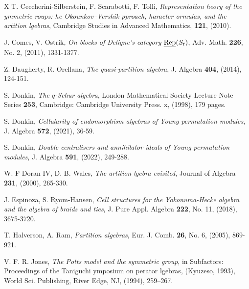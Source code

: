 \documentclass[10pt,hidelinks]{article}
\numberwithin{equation}{section}
\begin{document}
\begin{thebibliography}{X}
T. Ceccherini-Silberstein, F. Scarabotti, F. Tolli,
  \textit{Representation {\it {\color{black}{t}}}heory of the {\it {\color{black}{s}}}ymmetric
    {\it {\color{black}{g}}}roups: {\it {\color{black}{t}}}he Okounkov–Vershik {\it {\color{black}{a}}}pproach, {\it {\color{black}{c}}}haracter {\it {\color{black}{f}}}ormulas, and the
  {\it {\color{black}{p}}}artition {\it {\color{black}{a}}}lgebras},
  Cambridge Studies in Advanced Mathematics, {\bf 121}, (2010).

J. Comes, V. Ostrik, \textit{On blocks of Deligne’s category $ \underline{\rm Rep}(S_t) $}, 
Adv. Math. {\bf 226}, No. 2, (2011), 1331-1377.
  
  



  

Z. Daugherty, R. Orellana,  \textit{The quasi-partition algebra}, 
J. Algebra {\bf 404}, (2014), 124-151.


  

S. Donkin, \textit{The $q$-Schur algebra}, 
London Mathematical Society Lecture Note Series {\bf 253}, Cambridge: Cambridge University Press. x, (1998), 179 pages. 


S. Donkin,
{\it Cellularity of endomorphism algebras of Young permutation modules}, 
J. Algebra {\bf 572}, (2021), 36-59.




S. Donkin,
{\it Double centralisers and annihilator ideals of Young permutation modules}, 
J. Algebra {\bf 591}, (2022), 249-288.



W. F Doran IV, D. B. Wales, \textit{The {\it {\color{black}{p}}}artition
  {\it {\color{black}{a}}}lgebra {\it {\color{black}{r}}}evisited},
  Journal of Algebra {\bf 231}, (2000), 265-330.
  

J. Espinoza, S. Ryom-Hansen,
{\it Cell structures for the Yokonuma-Hecke algebra and the algebra of braids and ties}, 
J. Pure Appl. Algebra {\bf 222}, No. 11, (2018), 3675-3720. 

  
T. Halverson, A. Ram,
\textit{Partition algebras}, 
Eur. J. Comb. {\bf 26}, No. 6, (2005), 869-921.
  

 V. F. R. Jones,
\textit{The Potts model and the symmetric group}, in Subfactors: Proceedings of the
Taniguchi { {\color{black}{s}}}ymposium on {{\color{black}{o}}}perator
{{\color{black}{a}}}lgebras, (Kyuzeso, 1993), World Sci. Publishing, River
Edge, NJ, (1994), 259–267.






\end{thebibliography}
\end{document}
